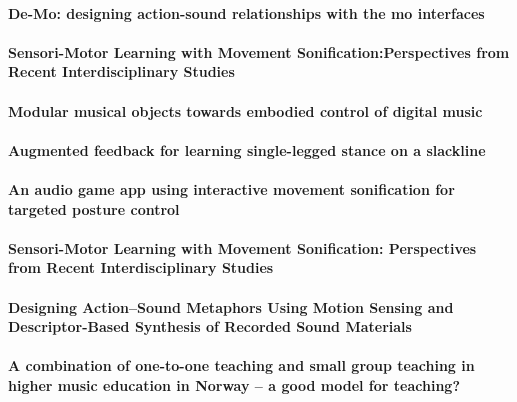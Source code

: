 \documentclass[11pt]{article}
\begin{document}
\paragraph{De-Mo: designing action-sound relationships with the mo interfaces} \citep{bevilacqua_-mo_2013}

\paragraph{Sensori-Motor Learning with Movement Sonification:Perspectives from Recent Interdisciplinary Studies} \citep{bevilacqua_sensori-motor_2016}

\paragraph{Modular musical objects towards embodied control of digital music} \citep{rasamimanana_modular_2011}

\paragraph{Augmented feedback for learning single-legged stance on a slackline} \citep{anlauff_augmented_2013}

\paragraph{An audio game app using interactive movement sonification for targeted posture control} \citep{avissar_audio_2013}

\paragraph{Sensori-Motor Learning with Movement Sonification: Perspectives from Recent Interdisciplinary Studies} \citep{bevilacqua_sensori-motor_2016}

\paragraph{Designing Action–Sound Metaphors Using Motion Sensing and Descriptor-Based Synthesis of Recorded Sound Materials} \citep{francoise_designing_2017}

\paragraph{A combination of one-to-one teaching and small group teaching in higher music education in Norway – a good model for teaching?} \citep{bjontegaard_combination_2015}
\end{document}
